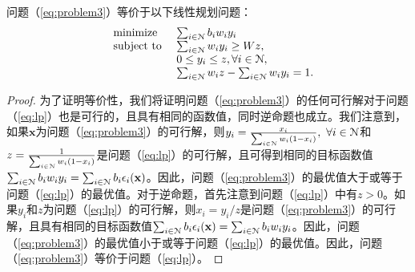 	\begin{lm}\label{lm:lp}
		问题（\ref{eq:problem3}）等价于以下线性规划问题：
		\begin{equation}
		\hspace{-0.0cm}
		\begin{array}
		[c]{lll}%
		&{\text{minimize}}&~\sum_{i\in\N}b_iw_iy_i
		\\
		&\text{subject to}&~ \sum_{i\in\N}w_iy_i\ge Wz,\\
		&&~ 0\le y_i\le z, \forall i\in\N,\\
		&&~ \sum_{i\in\N}w_iz-\sum_{i\in\N}w_iy_i=1.
		\end{array}
		\label{eq:lp}
		\end{equation}
	\end{lm} 
	\begin{proof}
		为了证明等价性，我们将证明问题（\ref{eq:problem3}）的任何可行解对于问题（\ref{eq:lp}）也是可行的，且具有相同的函数值，同时逆命题也成立。我们注意到，如果$\mathbf{x}$为问题（\ref{eq:problem3}）的可行解，则$y_i=\frac{x_i}{\sum_{i\in\mathcal{N}}w_i(1-x_i)},~\forall i\in\mathcal{N}$和$z=\frac{1}{\sum_{i\in\mathcal{N}}w_i(1-x_i)}$是问题（\ref{eq:lp}）的可行解，且可得到相同的目标函数值$\sum_{i\in\mathcal{N}}b_iw_iy_i=\sum_{i\in\mathcal{N}}b_i\epsilon_i(\mathbf{x})$。因此，问题（\ref{eq:problem3}）的最优值大于或等于问题（\ref{eq:lp}）的最优值。对于逆命题，首先注意到问题（\ref{eq:lp}）中有$z>0$。如果$y_i$和$z$为问题（\ref{eq:lp}）的可行解，则$x_i=y_i/z$是问题（\ref{eq:problem3}）的可行解，且具有相同的目标函数值$\sum_{i\in\mathcal{N}}b_i\epsilon_i(\mathbf{x})=\sum_{i\in\mathcal{N}}b_iw_iy_i$。因此，问题（\ref{eq:problem3}）的最优值小于或等于问题（\ref{eq:lp}）的最优值。因此，问题（\ref{eq:problem3}）等价于问题（\ref{eq:lp}）。
	\end{proof}
	

